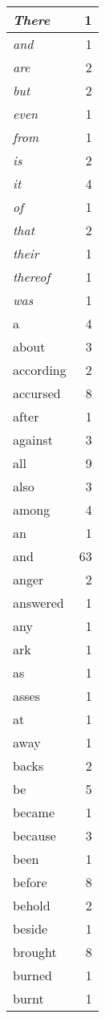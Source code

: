 \begin{center}
\begin{longtable}{l|r}
\emph{There} & 1\\ \hline 
\emph{and} & 1\\ \hline 
\emph{are} & 2\\ \hline 
\emph{but} & 2\\ \hline 
\emph{even} & 1\\ \hline 
\emph{from} & 1\\ \hline 
\emph{is} & 2\\ \hline 
\emph{it} & 4\\ \hline 
\emph{of} & 1\\ \hline 
\emph{that} & 2\\ \hline 
\emph{their} & 1\\ \hline 
\emph{thereof} & 1\\ \hline 
\emph{was} & 1\\ \hline 
a & 4\\ \hline 
about & 3\\ \hline 
according & 2\\ \hline 
accursed & 8\\ \hline 
after & 1\\ \hline 
against & 3\\ \hline 
all & 9\\ \hline 
also & 3\\ \hline 
among & 4\\ \hline 
an & 1\\ \hline 
and & 63\\ \hline 
anger & 2\\ \hline 
answered & 1\\ \hline 
any & 1\\ \hline 
ark & 1\\ \hline 
as & 1\\ \hline 
asses & 1\\ \hline 
at & 1\\ \hline 
away & 1\\ \hline 
backs & 2\\ \hline 
be & 5\\ \hline 
became & 1\\ \hline 
because & 3\\ \hline 
been & 1\\ \hline 
before & 8\\ \hline 
behold & 2\\ \hline 
beside & 1\\ \hline 
brought & 8\\ \hline 
burned & 1\\ \hline 
burnt & 1\\ \hline 

\end{longtable}
\end{center}
